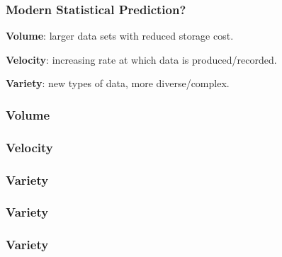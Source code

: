 \documentclass[12pt]{beamer}\usepackage[]{graphicx}\usepackage[]{color}
\begin{document}

\begin{frame}
\frametitle{Modern Statistical Prediction?}

\bbi
  \item \textbf{Volume}: larger data sets with reduced storage cost.
  \item \textbf{Velocity}: increasing rate at which data is produced/recorded.
  \item \textbf{Variety}: new types of data, more diverse/complex.
\ei
\eb

\end{frame}


\begin{frame}
\frametitle{Volume}
\begin{center}
\end{center}
\end{frame}


\begin{frame}
\frametitle{Velocity}
\begin{center}
\end{center}
\end{frame}


\begin{frame}
\frametitle{Variety}
\begin{center}
\end{center}
\end{frame}


\begin{frame}
\frametitle{Variety}
\begin{center}
\end{center}
\end{frame}


\begin{frame}
\frametitle{Variety}
\begin{center}
\end{center}
\end{frame}
\end{document}
